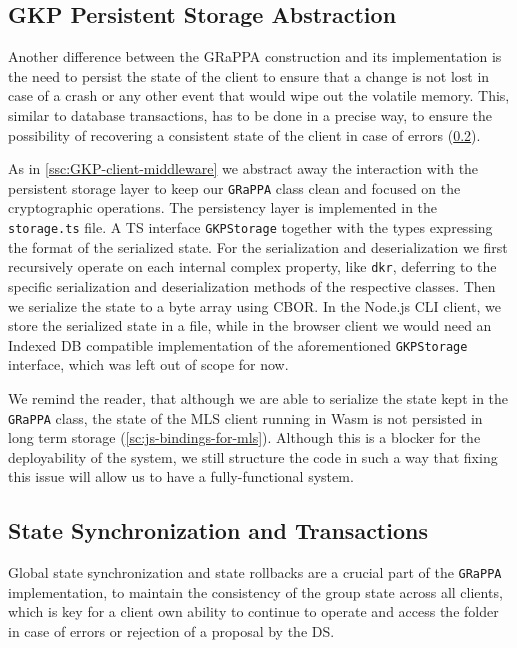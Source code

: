 \subsection{GKP Persistent Storage Abstraction}\label{ssc:GKP-persistent-storage}
Another difference between the GRaPPA construction and its implementation
is the need to persist the state of the client
to ensure that a change is not lost in case of a crash
or any other event that would wipe out the volatile memory.
This, similar to database transactions, has to be done
in a precise way, to ensure the possibility of recovering a
consistent state of the client in case of errors (\cref{sc:state-sync-rollbacks}). 

As in \cref{ssc:GKP-client-middleware} we abstract away the interaction
with the persistent storage layer to keep our
\texttt{GRaPPA} class clean and focused on the cryptographic operations.
The persistency layer is implemented in the \texttt{storage.ts} file.
A TS interface \texttt{GKPStorage} together with the types expressing
the format of the serialized state. For the serialization and
deserialization we first recursively operate on each
internal complex property, like \texttt{dkr}, deferring to
the specific serialization and deserialization methods of the
respective classes. Then we serialize the state to a byte array
using CBOR. In the Node.js CLI client, we store
the serialized state in a file, while in the browser client
we would need an Indexed DB compatible implementation of the
aforementioned \texttt{GKPStorage} interface, which was left
out of scope for now.

We remind the reader, that although we are able to serialize
the state kept in the \texttt{GRaPPA} class,
the state of the MLS client running in Wasm is not persisted
in long term storage (\cref{sc:js-bindings-for-mls}).
Although this is a blocker for the deployability of the system,
we still structure the code in such a way that fixing this
issue will allow us to have a fully-functional system.

\subsection{State Synchronization and Transactions}\label{sc:state-sync-rollbacks}

Global state synchronization and state rollbacks are a crucial part of the \texttt{GRaPPA} implementation,
to maintain the consistency of the group state across all clients, which is 
key for a client own ability to continue to operate and access the folder in case of
errors or rejection of a proposal by the DS.

